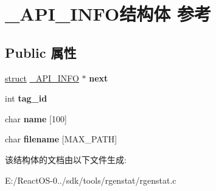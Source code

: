 \hypertarget{struct___a_p_i___i_n_f_o}{}\section{\+\_\+\+A\+P\+I\+\_\+\+I\+N\+F\+O结构体 参考}
\label{struct___a_p_i___i_n_f_o}
\subsection*{Public 属性}
\begin{DoxyCompactItemize}
\item 
\mbox{\label{struct___a_p_i___i_n_f_o_a3ee901d92758baced6e21fe0d663f4b3}} 
\hyperlink{interfacestruct}{struct} \hyperlink{struct___a_p_i___i_n_f_o}{\+\_\+\+A\+P\+I\+\_\+\+I\+N\+FO} $\ast$ {\bfseries next}
\item 
\mbox{\label{struct___a_p_i___i_n_f_o_a7ac726594816d0be2b3c685c069c4733}} 
int {\bfseries tag\+\_\+id}
\item 
\mbox{\label{struct___a_p_i___i_n_f_o_a74f0dba07500a3a62ba789c294686781}} 
char {\bfseries name} \mbox{[}100\mbox{]}
\item 
\mbox{\label{struct___a_p_i___i_n_f_o_aa317a5e348a5acfe0d8be369563a6f13}} 
char {\bfseries filename} \mbox{[}M\+A\+X\+\_\+\+P\+A\+TH\mbox{]}
\end{DoxyCompactItemize}


该结构体的文档由以下文件生成\+:\begin{DoxyCompactItemize}
\item 
E\+:/\+React\+O\+S-\/0../sdk/tools/rgenstat/rgenstat.\+c\end{DoxyCompactItemize}
